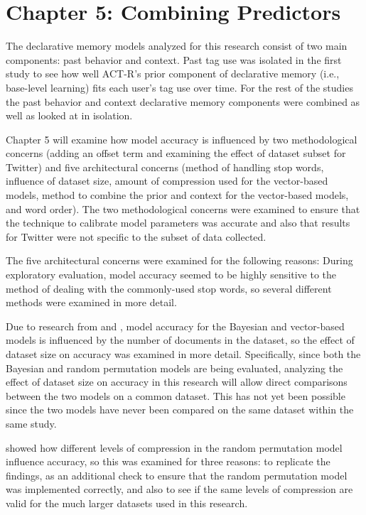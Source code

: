 \documentclass[man,floatsintext,donotrepeattitle]{apa6}
\begin{document}
\clearpage
\section{Chapter 5: Combining Predictors}

The declarative memory models analyzed for this research consist of two main components: past behavior and context.
Past tag use was isolated in the first study to see how well ACT-R's prior component of declarative memory (i.e., base-level learning) fits each user's tag use over time.
For the rest of the studies the past behavior and context declarative memory components were combined as well as looked at in isolation.

Chapter 5 will examine how model accuracy is influenced by two methodological concerns (adding an offset term and examining the effect of dataset subset for Twitter)
and five architectural concerns
(method of handling stop words, influence of dataset size, amount of compression used for the vector-based models, method to combine the prior and context for the vector-based models, and word order).
The two methodological concerns were examined to ensure that the technique to calibrate model parameters was accurate and also that results for Twitter were not specific to the subset of data collected. 

The five architectural concerns were examined for the following reasons:
During exploratory evaluation, model accuracy seemed to be highly sensitive to the method of dealing with the commonly-used stop words, so several different methods were examined in more detail.

Due to research from \textcite{Budiu2007} and \textcite{Recchia2010}, model accuracy for the Bayesian and vector-based models is influenced by the number of documents in the dataset,
so the effect of dataset size on accuracy was examined in more detail.
Specifically,
since both the Bayesian and random permutation models are being evaluated, analyzing the effect of dataset size on accuracy in this research will allow direct comparisons between the two models on a common dataset.
This has not yet been possible since the two models have never been compared on the same dataset within the same study.

\textcite{Sahlgren2008} showed how different levels of compression in the random permutation model influence accuracy, so this was examined for three reasons:
to replicate the findings,
as an additional check to ensure that the random permutation model was implemented correctly, and also to see if the same levels of compression are valid for the much larger datasets used in this research.
\end{document}
